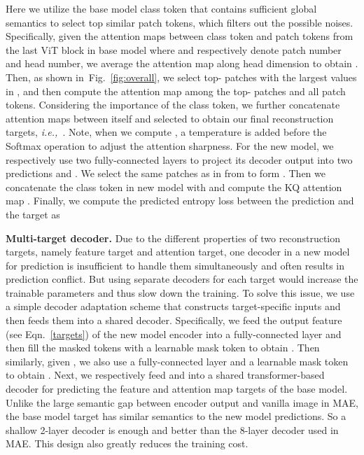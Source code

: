 \documentclass{article} \usepackage{iclr2023_conference,times}
\def\figref#1{figure~\ref{#1}}
\def\secref#1{section~\ref{#1}}
\newcommand{\myPara}[1]{\vspace{-.05in} \noindent\textbf{#1}}
\def\ie{\emph{i.e.,~}}
\renewcommand{\figref}[1]{Fig.~\ref{#1}}\newcommand{\tabref}[1]{Tab.~\ref{#1}}\renewcommand{\secref}[1]{Section~\ref{#1}}
\begin{document}
Here we utilize the base model class token that contains sufficient global semantics  
to select top similar patch tokens, which filters out the possible noises.  Specifically, given the attention maps   between class token and patch tokens  from the last ViT block in  base model where   and  respectively denote patch number and head number,  
we  average  the attention map   along head dimension to obtain . 
Then, as shown in~\figref{fig:overall}, we select top- patches with the largest values in , and then compute the attention map  among the  top- patches and all patch tokens. Considering the importance of the class token, we further concatenate attention maps between itself and selected  to obtain our final  reconstruction targets, \ie . 
Note, when we compute , a temperature  is added before the Softmax operation to adjust the attention sharpness.   
For the new model, we respectively use two fully-connected layers to project its decoder output into two predictions  and . 
We select the same patches as in  from  to form . 
Then we   concatenate the class token  in new model  with   and compute  the KQ attention map  .  
Finally, we compute the predicted entropy  loss between the prediction   and the   target    as 
 


\myPara{Multi-target  decoder.}
Due to the different properties of two reconstruction targets,  namely feature target and attention target,  
one decoder in a new model for prediction is insufficient to handle them simultaneously and often   results in prediction  conflict. 
But  using separate decoders for each target would increase the trainable parameters and thus slow down the training.  To solve this issue, we use a simple decoder adaptation scheme that constructs target-specific inputs and then feeds them into a shared decoder.
Specifically, we feed the output feature 
(see Eqn.~\ref{targets}) of the new model encoder into a fully-connected layer and then fill the masked tokens with a learnable mask token to obtain .  
Then similarly, given , we also use a fully-connected layer and a learnable mask token to obtain . 
Next, we respectively feed  and  into a shared transformer-based decoder for predicting the feature and attention map targets of the base model.  
Unlike the large semantic gap between encoder output and vanilla image  in MAE, the base model target has similar semantics to the new model predictions. So a shallow 2-layer decoder is enough and better than the 8-layer decoder used in MAE. This design also greatly reduces the training cost.
\end{document}
